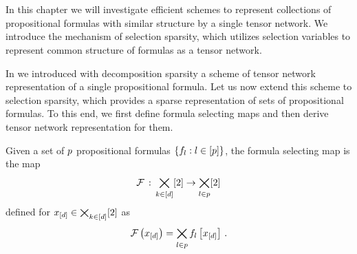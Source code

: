 \chapter{\chatextformulaSelection}\label{cha:formulaSelection}

In this chapter we will investigate efficient schemes to represent collections of propositional formulas with similar structure by a single tensor network.
We introduce the mechanism of selection sparsity, which utilizes selection variables to represent common structure of formulas as a tensor network.


In  we introduced with decomposition sparsity a scheme of tensor network representation of a single propositional formula.
Let us now extend this scheme to selection sparsity, which provides a sparse representation of sets of propositional formulas.
To this end, we first define formula selecting maps and then derive tensor network representation for them.

\begin{definition}
    Given a set of $p$ propositional formulas $\{f_{l} : l\in[p]\}$, the formula selecting map is the map
    \begin{align*}
        \mathcal{F} \,:\, \bigtimes_{k\in[d]}[2] \rightarrow \bigtimes_{l\in p} [2]
    \end{align*}
    defined for $x_{[d]}\in\bigtimes_{k\in[d]}[2]$ as
    \begin{align*}
        \mathcal{F}\left(x_{[d]}\right)
        = \bigtimes_{l\in p} f_{l}\left[x_{[d]}\right] \, .
    \end{align*}
\end{definition}

